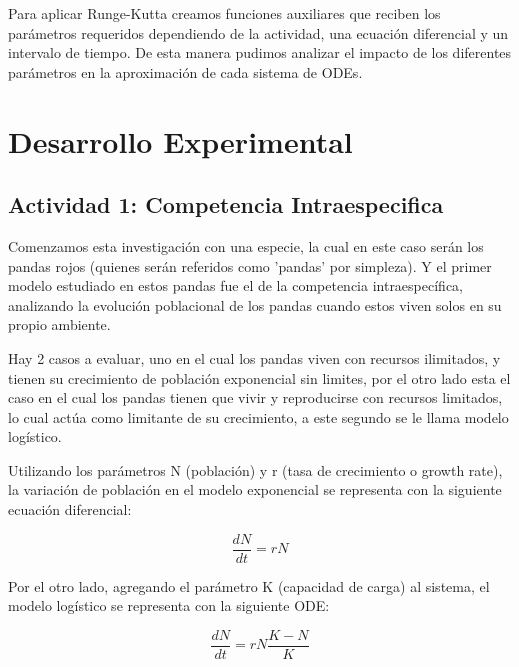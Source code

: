 \documentclass{article}
\begin{document}
\setlength{\abovedisplayskip}{-6pt}

\noindent Para aplicar Runge-Kutta creamos funciones auxiliares que reciben los parámetros requeridos dependiendo de la actividad, una ecuación diferencial y un intervalo de tiempo. De esta manera pudimos analizar el impacto de los diferentes parámetros en la aproximación de cada sistema de ODEs.


\section*{Desarrollo Experimental}


\subsection*{Actividad 1: Competencia Intraespecifica}

\noindent Comenzamos esta investigación con una especie, la cual en este caso serán los pandas rojos (quienes serán referidos como 'pandas' por simpleza). Y el primer modelo estudiado en estos pandas fue el de la competencia intraespecífica, analizando la evolución poblacional de los pandas cuando estos viven solos en su propio ambiente. \vspace{1\baselineskip}

\noindent Hay 2 casos a evaluar, uno en el cual los pandas viven con recursos ilimitados, y tienen su crecimiento de población exponencial sin limites, por el otro lado esta el caso en el cual los pandas tienen que vivir y reproducirse con recursos limitados, lo cual actúa como limitante de su crecimiento, a este segundo se le llama modelo logístico. \vspace{1\baselineskip}

\noindent Utilizando los parámetros N (población) y r (tasa de crecimiento o growth rate), la variación de población en el modelo exponencial se representa con la siguiente ecuación diferencial: \vspace{0.5\baselineskip}

\[\frac{dN}{dt} = rN \]

\vspace{0.75\baselineskip}

\noindent Por el otro lado, agregando el parámetro K (capacidad de carga) al sistema, el modelo logístico se representa con la siguiente ODE: \vspace{0.5\baselineskip}

\[\frac{dN}{dt} = rN \frac{K - N}{K}\]
\vspace{0.75\baselineskip}
\end{document}
